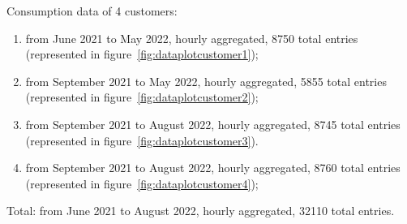 Consumption data of 4 customers:
\begin{enumerate}
  \item from June 2021 to May 2022, hourly aggregated, 8750 total entries (represented in figure~\ref{fig:dataplotcustomer1});
  \item from September 2021 to May 2022, hourly aggregated, 5855 total entries (represented in figure~\ref{fig:dataplotcustomer2});
  \item from September 2021 to August 2022, hourly aggregated, 8745 total entries (represented in figure~\ref{fig:dataplotcustomer3}).
  \item from September 2021 to August 2022, hourly aggregated, 8760 total entries (represented in figure~\ref{fig:dataplotcustomer4});
\end{enumerate}
Total: from June 2021 to August 2022, hourly aggregated, 32110 total entries.


